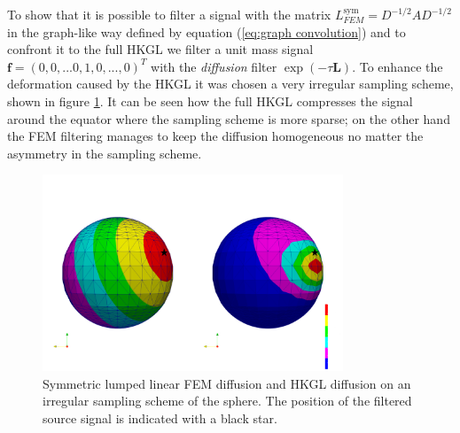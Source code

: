 To show that it is possible to filter a signal with the matrix $L_{FEM}^{\text{sym}} = D^{-1/2}AD^{-1/2}$ in the graph-like way defined by equation (\ref{eq:graph convolution}) and to confront it to the full HKGL we filter a unit mass signal $\mathbf{f}=(0,0,...0,1,0,...,0)^T$ with the \textit{diffusion} filter $\exp{(-\tau \mathbf L)}$. To enhance the deformation caused by the HKGL it was chosen a very irregular sampling scheme, shown in figure \ref{fig:FEM lumped symmetric diffusion on irregular sampling}. It can be seen how the full HKGL compresses the signal around the equator where the sampling scheme is more sparse; on the other hand the FEM filtering manages to keep the diffusion homogeneous no matter the asymmetry in the sampling scheme. 
\begin{figure}[h!]
	\centering
	\includegraphics[width=0.8\textwidth]{figs/Chapter3/diffusion.png}
	\caption{\label{fig:FEM lumped symmetric diffusion on irregular sampling}Symmetric lumped linear FEM diffusion and HKGL diffusion on an irregular sampling scheme of the sphere. The position of the filtered source signal is indicated with a black star.}
\end{figure}

